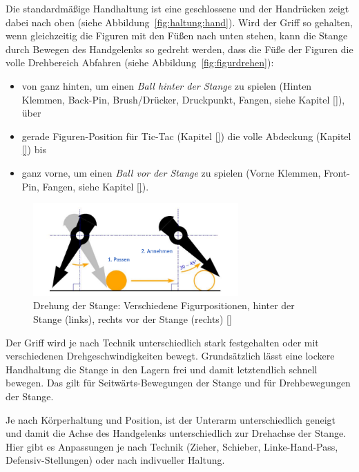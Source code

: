 Die standardmäßige Handhaltung ist eine geschlossene
und der Handrücken zeigt dabei nach oben (siehe Abbildung~\ref{fig:haltung:hand}).
Wird der Griff so gehalten, wenn gleichzeitig die Figuren mit den Füßen nach unten stehen, kann die Stange durch Bewegen des Handgelenks so gedreht werden, dass die Füße der Figuren die volle Drehbereich Abfahren (siehe Abbildung~\ref{fig:figurdrehen}):
\begin{itemize}
    \item von ganz hinten, um einen \textit{Ball hinter der Stange} zu spielen (Hinten Klemmen, Back-Pin, Brush/Drücker, Druckpunkt, Fangen, siehe Kapitel \ref{}), über
    \item gerade Figuren-Position für Tic-Tac (Kapitel \ref{}) die volle Abdeckung (Kapitel \ref{}) bis 
    \item ganz vorne, um einen \textit{Ball vor der Stange} zu spielen (Vorne Klemmen, Front-Pin, Fangen, siehe Kapitel \ref{}).
\end{itemize}

\begin{figure}
    \centering 
        \includegraphics[width=0.7\textwidth]{img/haltung_figur.png} 
        \caption{Drehung der Stange: Verschiedene Figurpositionen, hinter der Stange (links), rechts vor der Stange (rechts) [\cite{itsf_basics}]} 
        \label{fig:haltung:figur} 
\end{figure}

Der Griff wird je nach Technik unterschiedlich stark festgehalten oder mit verschiedenen Drehgeschwindigkeiten bewegt. 
Grundsätzlich lässt  eine lockere Handhaltung die Stange in den Lagern frei und damit letztendlich schnell bewegen.
Das gilt für Seitwärts-Bewegungen der Stange und für Drehbewegungen der Stange.

Je nach Körperhaltung und Position, ist der Unterarm unterschiedlich geneigt und damit die Achse des Handgelenks unterschiedlich zur Drehachse der Stange.
Hier gibt es Anpassungen je nach Technik (Zieher, Schieber, Linke-Hand-Pass, Defensiv-Stellungen) oder nach indivueller Haltung.

